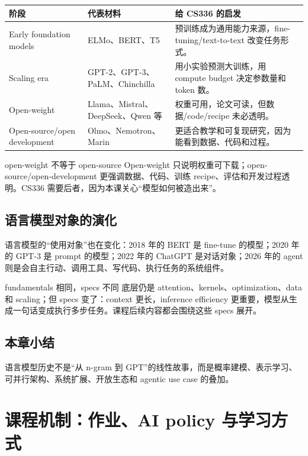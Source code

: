 \documentclass[a4paper]{article}
\begin{document}
\begin{longtable}{p{}p{}p{}}
\toprule
\textbf{阶段} & \textbf{代表材料} & \textbf{给 CS336 的启发} \\
\midrule
Early foundation models & ELMo、BERT、T5 & 预训练成为通用能力来源，fine-tuning/text-to-text 改变任务形式。 \\
Scaling era & GPT-2、GPT-3、PaLM、Chinchilla & 用小实验预测大训练，用 compute budget 决定参数量和 token 数。 \\
Open-weight & Llama、Mistral、DeepSeek、Qwen 等 & 权重可用，论文可读，但数据/code/recipe 未必透明。 \\
Open-source/open development & Olmo、Nemotron、Marin & 更适合教学和可复现研究，因为能看到数据、代码和过程。 \\
\bottomrule
\end{longtable}

\begin{warningbox}{open-weight 不等于 open-source}
Open-weight 只说明权重可下载；open-source/open-development 更强调数据、代码、训练 recipe、评估和开发过程透明。CS336 需要后者，因为本课关心“模型如何被造出来”。
\end{warningbox}

\subsection{语言模型对象的演化}

语言模型的“使用对象”也在变化：2018 年的 BERT 是 fine-tune 的模型；2020 年的 GPT-3 是 prompt 的模型；2022 年的 ChatGPT 是对话对象；2026 年的 agent 则是会自主行动、调用工具、写代码、执行任务的系统组件。

\begin{importantbox}{fundamentals 相同，specs 不同}
底层仍是 attention、kernels、optimization、data 和 scaling；但 specs 变了：context 更长，inference efficiency 更重要，模型从生成一句话变成执行多步任务。课程后续内容都会围绕这些 specs 展开。
\end{importantbox}

\subsection{本章小结}

语言模型历史不是“从 n-gram 到 GPT”的线性故事，而是概率建模、表示学习、可并行架构、系统扩展、开放生态和 agentic use case 的叠加。

\section{课程机制：作业、AI policy 与学习方式}
\end{document}
